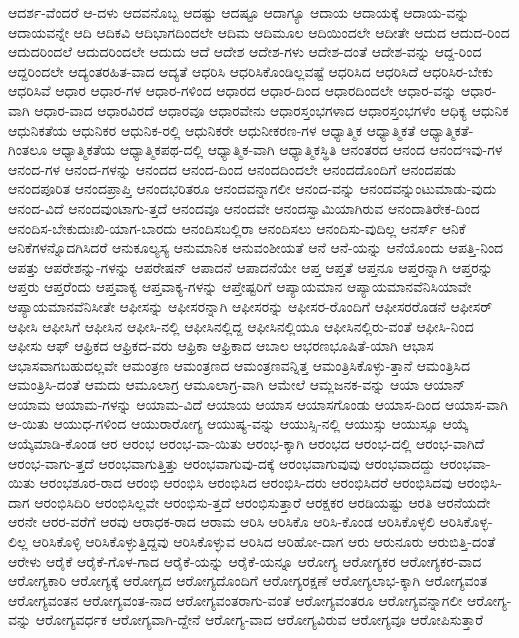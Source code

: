{ಆದರ್ಶ-ವೆಂದರೆ
ಆ-ದಳು
ಆದವನೊಬ್ಬ
ಆದಷ್ಟು
ಆದಷ್ಟೂ
ಆದಾಗ್ಯೂ
ಆದಾಯ
ಆದಾಯಕ್ಕೆ
ಆದಾಯ-ವನ್ನು
ಆದಾಯವನ್ನೇ
ಆದಿ
ಆದಿಕವಿ
ಆದಿಭಾಗದಿಂದಲೇ
ಆದಿಮ
ಆದಿಮೂಲ
ಆದಿಯಿಂದಲೇ
ಆದೀತೇ
ಆದುದ
ಆದುದ-ರಿಂದ
ಆದುದರಿಂದಲೆ
ಆದುದರಿಂದಲೇ
ಆದುದು
ಆದೆ
ಆದೇಶ
ಆದೇಶ-ಗಳು
ಆದೇಶ-ದಂತೆ
ಆದೇಶ-ವನ್ನು
ಆದ್ದ-ರಿಂದ
ಆದ್ದರಿಂದಲೇ
ಆದ್ಯಂತರಹಿತ-ವಾದ
ಆದ್ಯತೆ
ಆಧರಿಸಿ
ಆಧರಿಸಿಕೊಂಡಿಲ್ಲವಷ್ಟೆ
ಆಧರಿಸಿದ
ಆಧರಿಸಿದೆ
ಆಧರಿಸಿರ-ಬೇಕು
ಆಧರಿಸಿವೆ
ಆಧಾರ
ಆಧಾರ-ಗಳ
ಆಧಾರ-ಗಳಿಂದ
ಆಧಾರದ
ಆಧಾರ-ದಿಂದ
ಆಧಾರದಿಂದಲೇ
ಆಧಾರ-ವನ್ನು
ಆಧಾರ-ವಾಗಿ
ಆಧಾರ-ವಾದ
ಆಧಾರವಿರದೆ
ಆಧಾರವೂ
ಆಧಾರವೇನು
ಆಧಾರಸ್ತಂಭಗಳಾದ
ಆಧಾರಸ್ತಂಭಗಳೆಂ
ಆಧಿಕ್ಯ
ಆಧುನಿಕ
ಆಧುನಿಕತೆಯ
ಆಧುನಿಕರ
ಆಧುನಿಕ-ರಲ್ಲಿ
ಆಧುನಿಕರೇ
ಆಧುನೀಕರಣ-ಗಳ
ಆಧ್ಯಾತ್ಮಿಕ
ಆಧ್ಯಾತ್ಮಿಕತೆ
ಆಧ್ಯಾತ್ಮಿಕತೆ-ಗಿಂತಲೂ
ಆಧ್ಯಾತ್ಮಿಕತೆಯ
ಆಧ್ಯಾತ್ಮಿಕಪಥ-ದಲ್ಲಿ
ಆಧ್ಯಾತ್ಮಿಕ-ವಾಗಿ
ಆಧ್ಯಾತ್ಮಿಕಸ್ಥಿತಿ
ಆನಂತರದ
ಆನಂದ
ಆನಂದಇವು-ಗಳ
ಆನಂದ-ಗಳ
ಆನಂದ-ಗಳನ್ನು
ಆನಂದದ
ಆನಂದ-ದಿಂದ
ಆನಂದದಿಂದಲೇ
ಆನಂದದೊಂದಿಗೆ
ಆನಂದಪಡು
ಆನಂದಪೂರಿತ
ಆನಂದಪ್ರಾಪ್ತಿ
ಆನಂದಭರಿತರೂ
ಆನಂದವನ್ನಾಗಲೀ
ಆನಂದ-ವನ್ನು
ಆನಂದವನ್ನುಂಟುಮಾಡು-ವುದು
ಆನಂದ-ವಿದೆ
ಆನಂದವುಂಟಾಗು-ತ್ತದೆ
ಆನಂದವೂ
ಆನಂದವೇ
ಆನಂದಸ್ವಾಮಿಯಾಗಿರುವ
ಆನಂದಾತಿರೇಕ-ದಿಂದ
ಆನಂದಿಸ-ಬೇಕುದುಃಖಿ-ಯಾಗ-ಬಾರದು
ಆನಂದಿಸಬಲ್ಲಿರಾ
ಆನಂದಿಸಲು
ಆನಂದಿಸು-ವುದಿಲ್ಲ
ಆನರ್ಸ್
ಆನಿಕೆ
ಆನಿಕೆಗಳನ್ನೊದಗಿಸಿದರೆ
ಆನುಕೂಲ್ಯಸ್ಯ
ಆನುಮಾನಿಕ
ಆನುವಂಶೀಯತೆ
ಆನೆ
ಆನೆ-ಯನ್ನು
ಆನೆಯೊಂದು
ಆಪತ್ತಿ-ನಿಂದ
ಆಪತ್ತು
ಆಪರೇಶನ್ನು-ಗಳನ್ನು
ಆಪರೇಷನ್
ಆಪಾದನೆ
ಆಪಾದನೆಯೇ
ಆಪ್ತ
ಆಪ್ತತೆ
ಆಪ್ತನೂ
ಆಪ್ತರನ್ನಾಗಿ
ಆಪ್ತರನ್ನು
ಆಪ್ತರು
ಆಪ್ತರೆಂದು
ಆಪ್ತವಾಕ್ಯ
ಆಪ್ತವಾಕ್ಯ-ಗಳನ್ನು
ಆಪ್ತೇಷ್ಟರಿಗೆ
ಆಪ್ಯಾಯಮಾನ
ಆಪ್ಯಾಯಮಾನವೆನಿಸಿಯಾವೇ
ಆಪ್ಯಾಯಮಾನವೆನಿಸೀತೇ
ಆಫೀಸನ್ನು
ಆಫೀಸರನ್ನಾಗಿ
ಆಫೀಸರನ್ನು
ಆಫೀಸರ-ರೊಂದಿಗೆ
ಆಫೀಸರರೊಡನೆ
ಆಫೀಸರ್
ಆಫೀಸಿ
ಆಫೀಸಿಗೆ
ಆಫೀಸಿನ
ಆಫೀಸಿ-ನಲ್ಲಿ
ಆಫೀಸಿನಲ್ಲಿದ್ದ
ಆಫೀಸಿನಲ್ಲಿಯೂ
ಆಫೀಸಿನಲ್ಲಿರು-ವಂತೆ
ಆಫೀಸಿ-ನಿಂದ
ಆಫೀಸು
ಆಫ್
ಆಫ್ರಿಕದ
ಆಫ್ರಿಕದ-ವರು
ಆಫ್ರಿಕಾ
ಆಫ್ರಿಕಾದ
ಆಬಾಲ
ಆಭರಣಭೂಷಿತೆ-ಯಾಗಿ
ಆಭಾಸ
ಆಭಾಸವಾಗಬಹುದಲ್ಲವೇ
ಆಮಂತ್ರಣ
ಆಮಂತ್ರಣದ
ಆಮಂತ್ರಣವನ್ನಿತ್ತ
ಆಮಂತ್ರಿಸಿಕೊಳ್ಳು-ತ್ತಾನೆ
ಆಮಂತ್ರಿಸಿದ
ಆಮಂತ್ರಿಸಿ-ದಂತೆ
ಆಮದು
ಆಮೂಲಾಗ್ರ
ಆಮೂಲಾಗ್ರ-ವಾಗಿ
ಆಮೇಲೆ
ಆಮ್ಲಜನಕ-ವನ್ನು
ಆಯಾ
ಆಯಾನ್
ಆಯಾಮ
ಆಯಾಮ-ಗಳನ್ನು
ಆಯಾಮ-ವಿದೆ
ಆಯಾಯ
ಆಯಾಸ
ಆಯಾಸಗೊಂಡು
ಆಯಾಸ-ದಿಂದ
ಆಯಾಸ-ವಾಗಿ
ಆ-ಯಿತು
ಆಯುಧ-ಗಳಿಂದ
ಆಯುರಾರೋಗ್ಯ
ಆಯುಷ್ಯ-ವನ್ನು
ಆಯುಸ್ಸಿ-ನಲ್ಲಿ
ಆಯುಸ್ಸು
ಆಯುಸ್ಸೂ
ಆಯ್ಕೆ
ಆಯ್ಕೆಮಾಡಿ-ಕೊಂಡ
ಆರ
ಆರಂಭ
ಆರಂಭ-ವಾ-ಯಿತು
ಆರಂಭ-ಕ್ಕಾಗಿ
ಆರಂಭದ
ಆರಂಭ-ದಲ್ಲಿ
ಆರಂಭ-ವಾಗಿದೆ
ಆರಂಭ-ವಾಗು-ತ್ತದೆ
ಆರಂಭವಾಗುತ್ತಿತ್ತು
ಆರಂಭವಾಗುವು-ದಕ್ಕೆ
ಆರಂಭವಾಗುವುವು
ಆರಂಭವಾದದ್ದು
ಆರಂಭವಾ-ಯಿತು
ಆರಂಭಶೂರ-ರಾದ
ಆರಂಭಿ
ಆರಂಭಿಸಿ
ಆರಂಭಿಸಿದ
ಆರಂಭಿಸಿ-ದರು
ಆರಂಭಿಸಿದರೆ
ಆರಂಭಿಸಿದವು
ಆರಂಭಿಸಿ-ದಾಗ
ಆರಂಭಿಸಿದಿರಿ
ಆರಂಭಿಸಿಲ್ಲವೇ
ಆರಂಭಿಸು-ತ್ತದೆ
ಆರಂಭಿಸುತ್ತಾರೆ
ಆರಕ್ಷಕರ
ಆರಡಿಯಷ್ಟು
ಆರತಿ
ಆರನೆಯದೇ
ಆರನೇ
ಆರರ-ವರೆಗೆ
ಆರವು
ಆರಾಧಕ-ರಾದ
ಆರಾಮ
ಆರಿಸಿ
ಆರಿಸಿಕೊ
ಆರಿಸಿ-ಕೊಂಡ
ಆರಿಸಿಕೊಳ್ಳಲಿ
ಆರಿಸಿಕೊಳ್ಳ-ಲಿಲ್ಲ
ಆರಿಸಿಕೊಳ್ಳಿ
ಆರಿಸಿಕೊಳ್ಳುತ್ತಿದ್ದವು
ಆರಿಸಿಕೊಳ್ಳುವ
ಆರಿಸಿದ
ಆರಿಹೋ-ದಾಗ
ಆರು
ಆರುನೂರು
ಆರುಬಿತ್ತಿ-ದಂತೆ
ಆರೇಳು
ಆರೈಕೆ
ಆರೈಕೆ-ಗೊಳ-ಗಾದ
ಆರೈಕೆ-ಯನ್ನು
ಆರೈಕೆ-ಯನ್ನೂ
ಆರೋಗ್ಯ
ಆರೋಗ್ಯಕರ
ಆರೋಗ್ಯಕರ-ವಾದ
ಆರೋಗ್ಯಕಾರಿ
ಆರೋಗ್ಯಕ್ಕೆ
ಆರೋಗ್ಯದ
ಆರೋಗ್ಯದೊಂದಿಗೆ
ಆರೋಗ್ಯರಕ್ಷಣೆ
ಆರೋಗ್ಯಲಾಭ-ಕ್ಕಾಗಿ
ಆರೋಗ್ಯವಂತ
ಆರೋಗ್ಯವಂತನ
ಆರೋಗ್ಯವಂತ-ನಾದ
ಆರೋಗ್ಯವಂತರಾಗು-ವಂತೆ
ಆರೋಗ್ಯವಂತರೂ
ಆರೋಗ್ಯವನ್ನಾಗಲೀ
ಆರೋಗ್ಯ-ವನ್ನು
ಆರೋಗ್ಯವರ್ಧಕ
ಆರೋಗ್ಯವಾಗಿ-ದ್ದೇನೆ
ಆರೋಗ್ಯ-ವಾದ
ಆರೋಗ್ಯವಿರುವ
ಆರೋಗ್ಯವೂ
ಆರೋಪಿಸುತ್ತಾರೆ
}

